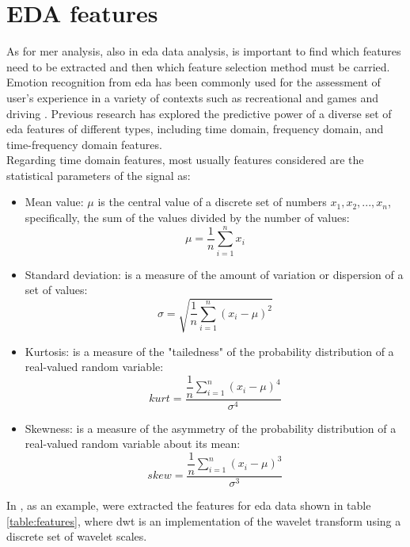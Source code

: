 \section{EDA features}\label{EDA_features}
As for \gls{mer} analysis, also in \gls{eda} data analysis, is important to find which features need to be extracted and then which feature selection method must be carried.
\\ \indent
Emotion recognition from \gls{eda} has been commonly used for the assessment of user's experience in a variety of contexts such as recreational and games \cite{drachen2010correlation} and driving \cite{healey2005detecting}. Previous research has explored the predictive power of a diverse set of \gls{eda} features of different types, including time domain, frequency domain, and time-frequency domain features.
\\ \indent
Regarding time domain features, most usually features considered are the statistical parameters of the signal as:
\begin{itemize}
	\item Mean value: $\mu$ is the central value of a discrete set of numbers $x_1,x_2,...,x_n$, specifically, the sum of the values divided by the number of values:
		\begin{equation}
		\mu=\dfrac{1}{n} \sum_{i=1}^{n}{x_i}
		\end{equation}
	\item Standard deviation:  is a measure of the amount of variation or dispersion of a set of values:
		\begin{equation}
		\sigma=\sqrt{\dfrac{1}{n}\sum_{i=1}^{n}({x_i-\mu})^2}
		\end{equation}
	\item Kurtosis: is a measure of the "tailedness" of the probability distribution of a real-valued random variable:
		\begin{equation}
		kurt=\dfrac{\dfrac{1}{n} \sum_{i=1}^{n}{(x_i-\mu)^4}}{\sigma^4}
		\end{equation}
	\item Skewness: is a measure of the asymmetry of the probability distribution of a real-valued random variable about its mean:
		\begin{equation}
		skew=\dfrac{\dfrac{1}{n} \sum_{i=1}^{n}{(x_i-\mu)^3}}{\sigma^3}
		\end{equation}
\end{itemize}
In \cite{shukla2019feature}, as an example, were extracted the features for \gls{eda} data shown in table \ref{table:features}, where \gls{dwt} is an implementation of the wavelet transform using a discrete set of wavelet scales.
